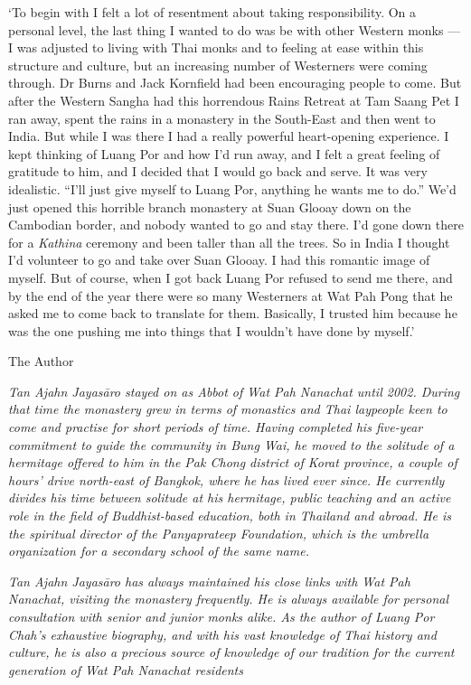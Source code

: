 `To begin with I felt a lot of resentment about taking responsibility.
On a personal level, the last thing I wanted to do was be with other
Western monks --- I was adjusted to living with Thai monks and to
feeling at ease within this structure and culture, but an increasing
number of Westerners were coming through. Dr Burns and Jack Kornfield
had been encouraging people to come. But after the Western Sangha had
this horrendous Rains Retreat at Tam Saang Pet I ran away, spent the
rains in a monastery in the South-East and then went to India. But while
I was there I had a really powerful heart-opening experience. I kept
thinking of Luang Por and how I'd run away, and I felt a great feeling
of gratitude to him, and I decided that I would go back and serve. It
was very idealistic. ``I'll just give myself to Luang Por, anything he
wants me to do.'' We'd just opened this horrible branch monastery at
Suan Glooay down on the Cambodian border, and nobody wanted to go and
stay there. I'd gone down there for a \emph{Kathina} ceremony and been
taller than all the trees. So in India I thought I'd volunteer to go and
take over Suan Glooay. I had this romantic image of myself. But of
course, when I got back Luang Por refused to send me there, and by the
end of the year there were so many Westerners at Wat Pah Pong that he
asked me to come back to translate for them. Basically, I trusted him
because he was the one pushing me into things that I wouldn't have done
by myself.'



The Author

\emph{Tan Ajahn Jayasāro stayed on as Abbot of Wat Pah Nanachat until
2002. During that time the monastery grew in terms of monastics and Thai
laypeople keen to come and practise for short periods of time. Having
completed his five-year commitment to guide the community in Bung Wai,
he moved to the solitude of a hermitage offered to him in the Pak Chong
district of Korat province, a couple of hours' drive north-east of
Bangkok, where he has lived ever since. He currently divides his time
between solitude at his hermitage, public teaching and an active role in
the field of Buddhist-based education, both in Thailand and abroad. He
is the spiritual director of the Panyaprateep Foundation, which is the
umbrella organization for a secondary school of the same name.}

\emph{Tan Ajahn Jayasāro has always maintained his close links with Wat
Pah Nanachat, visiting the monastery frequently. He is always available
for personal consultation with senior and junior monks alike. As the
author of Luang Por Chah's exhaustive biography, and with his vast
knowledge of Thai history and culture, he is also a precious source of
knowledge of our tradition for the current generation of Wat Pah
Nanachat residents}

